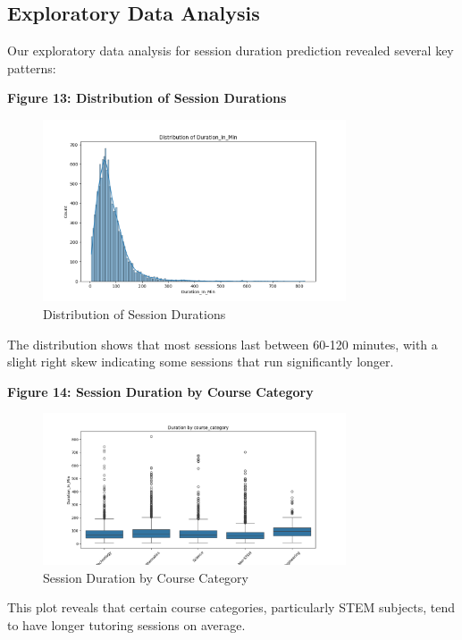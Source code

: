\documentclass[12pt,letterpaper]{article}
\begin{document}
\subsection{Exploratory Data Analysis}

Our exploratory data analysis for session duration prediction revealed several key patterns:

\textbf{Figure 13: Distribution of Session Durations}

\begin{figure}[H]
    \centering
    \includegraphics[width=0.8\textwidth]{duration_prediction/visualizations/duration_distribution.png}
    \caption{Distribution of Session Durations}
\end{figure}

The distribution shows that most sessions last between 60-120 minutes, with a slight right skew indicating some sessions that run significantly longer.

\textbf{Figure 14: Session Duration by Course Category}

\begin{figure}[H]
    \centering
    \includegraphics[width=0.8\textwidth]{duration_prediction/visualizations/boxplot_course_category.png}
    \caption{Session Duration by Course Category}
\end{figure}

This plot reveals that certain course categories, particularly STEM subjects, tend to have longer tutoring sessions on average.
\end{document}
